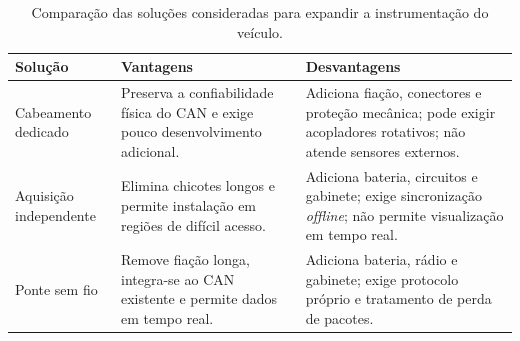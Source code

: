 \begin{table}[htbp]
\centering
\footnotesize
\setlength{\tabcolsep}{4pt}
\renewcommand{\arraystretch}{1.22}
\begin{tabularx}{\textwidth}{>{\raggedright\arraybackslash}p{}|>{\raggedright\arraybackslash}X|>{\raggedright\arraybackslash}X}
\hline
Solução & Vantagens & Desvantagens \\
\hline
Cabeamento dedicado &
Preserva a confiabilidade física do CAN e exige pouco desenvolvimento adicional. &
Adiciona fiação, conectores e proteção mecânica; pode exigir acopladores rotativos; não atende sensores externos. \\
\hline
Aquisição independente &
Elimina chicotes longos e permite instalação em regiões de difícil acesso. &
Adiciona bateria, circuitos e gabinete; exige sincronização \emph{offline}; não permite visualização em tempo real. \\
\hline
Ponte sem fio &
Remove fiação longa, integra-se ao CAN existente e permite dados em tempo real. &
Adiciona bateria, rádio e gabinete; exige protocolo próprio e tratamento de perda de pacotes. \\
\hline
\end{tabularx}
\caption{Comparação das soluções consideradas para expandir a instrumentação do veículo.}
\label{tab:solucoes-consideradas}
\end{table}
